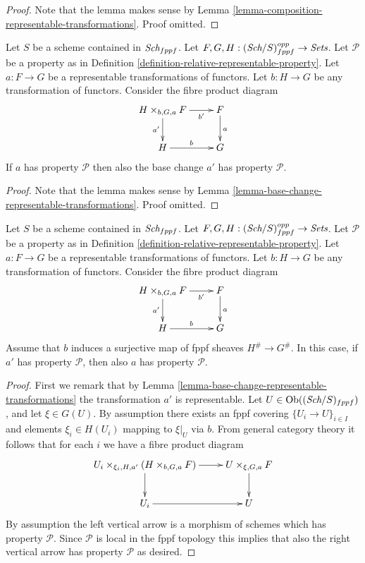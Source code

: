 \begin{proof}
Note that the lemma makes sense by
Lemma \ref{lemma-composition-representable-transformations}.
Proof omitted.
\end{proof}

\begin{lemma}
\label{lemma-base-change-representable-transformations-property}
Let $S$ be a scheme contained in $\textit{Sch}_{fppf}$.
Let $F, G, H : (\textit{Sch}/S)_{fppf}^{opp} \to \textit{Sets}$.
Let $\mathcal{P}$ be a property as in
Definition \ref{definition-relative-representable-property}.
Let $a : F \to G$ be a representable transformations of functors.
Let $b : H \to G$ be any transformation of functors.
Consider the fibre product diagram
$$
\xymatrix{
H \times_{b, G, a} F \ar[r]_-{b'} \ar[d]_{a'} & F \ar[d]^a \\
H \ar[r]^b & G
}
$$
If $a$ has property $\mathcal{P}$ then also the base change $a'$
has property $\mathcal{P}$.
\end{lemma}

\begin{proof}
Note that the lemma makes sense by
Lemma \ref{lemma-base-change-representable-transformations}.
Proof omitted.
\end{proof}

\begin{lemma}
\label{lemma-descent-representable-transformations-property}
Let $S$ be a scheme contained in $\textit{Sch}_{fppf}$.
Let $F, G, H : (\textit{Sch}/S)_{fppf}^{opp} \to \textit{Sets}$.
Let $\mathcal{P}$ be a property as in
Definition \ref{definition-relative-representable-property}.
Let $a : F \to G$ be a representable transformations of functors.
Let $b : H \to G$ be any transformation of functors.
Consider the fibre product diagram
$$
\xymatrix{
H \times_{b, G, a} F \ar[r]_-{b'} \ar[d]_{a'} & F \ar[d]^a \\
H \ar[r]^b & G
}
$$
Assume that $b$ induces a surjective map of fppf sheaves $H^\# \to G^\#$.
In this case, if $a'$ has property $\mathcal{P}$, then also $a$
has property $\mathcal{P}$.
\end{lemma}

\begin{proof}
First we remark that by
Lemma \ref{lemma-base-change-representable-transformations}
the transformation $a'$ is representable.
Let $U \in \mathop{\rm Ob}\nolimits((\textit{Sch}/S)_{fppf})$, and let
$\xi \in G(U)$. By assumption there exists an fppf covering
$\{U_i \to U\}_{i \in I}$ and elements $\xi_i \in H(U_i)$ mapping
to $\xi|_U$ via $b$. From general category theory it follows that for
each $i$ we have a fibre product diagram
$$
\xymatrix{
U_i \times_{\xi_i, H, a'} (H \times_{b, G, a} F) \ar[r] \ar[d] &
U \times_{\xi, G, a} F \ar[d] \\
U_i \ar[r] & U
}
$$
By assumption the left vertical arrow is a morphism of schemes which
has property $\mathcal{P}$. Since $\mathcal{P}$ is local in the fppf
topology this implies that also the right vertical arrow has property
$\mathcal{P}$ as desired.
\end{proof}

